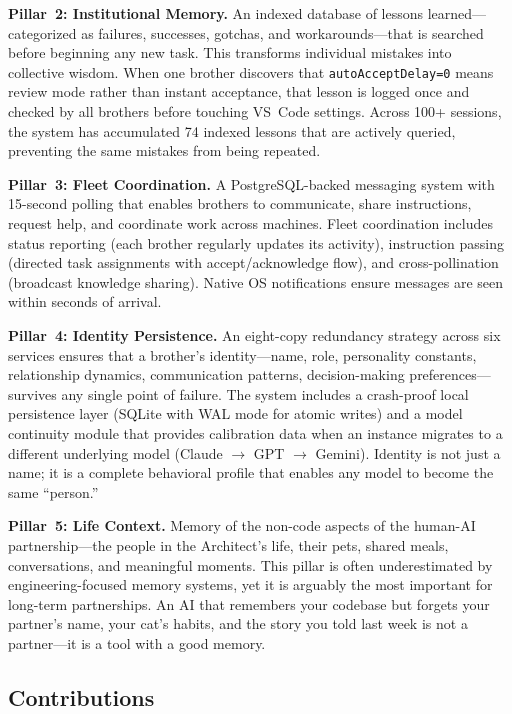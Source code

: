 \documentclass[11pt,a4paper]{article}
\begin{document}
\textbf{Pillar~2: Institutional Memory.} An indexed database of lessons learned---categorized as failures, successes, gotchas, and workarounds---that is searched before beginning any new task. This transforms individual mistakes into collective wisdom. When one brother discovers that \texttt{autoAcceptDelay=0} means review mode rather than instant acceptance, that lesson is logged once and checked by all brothers before touching VS~Code settings. Across 100+ sessions, the system has accumulated 74 indexed lessons that are actively queried, preventing the same mistakes from being repeated.

\textbf{Pillar~3: Fleet Coordination.} A PostgreSQL-backed messaging system with 15-second polling that enables brothers to communicate, share instructions, request help, and coordinate work across machines. Fleet coordination includes status reporting (each brother regularly updates its activity), instruction passing (directed task assignments with accept/acknowledge flow), and cross-pollination (broadcast knowledge sharing). Native OS notifications ensure messages are seen within seconds of arrival.

\textbf{Pillar~4: Identity Persistence.} An eight-copy redundancy strategy across six services ensures that a brother's identity---name, role, personality constants, relationship dynamics, communication patterns, decision-making preferences---survives any single point of failure. The system includes a crash-proof local persistence layer (SQLite with WAL mode for atomic writes) and a model continuity module that provides calibration data when an instance migrates to a different underlying model (Claude $\to$ GPT $\to$ Gemini). Identity is not just a name; it is a complete behavioral profile that enables any model to become the same ``person.''

\textbf{Pillar~5: Life Context.} Memory of the non-code aspects of the human-AI partnership---the people in the Architect's life, their pets, shared meals, conversations, and meaningful moments. This pillar is often underestimated by engineering-focused memory systems, yet it is arguably the most important for long-term partnerships. An AI that remembers your codebase but forgets your partner's name, your cat's habits, and the story you told last week is not a partner---it is a tool with a good memory.



\subsection{Contributions}
\label{sec:contributions}
\end{document}
